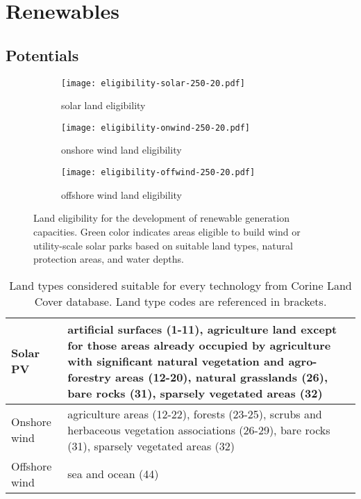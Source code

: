 
\section{Renewables}
\label{sec:si:renewables}

\subsection{Potentials}
\label{sec:si:renewable-potentials}


\begin{figure}
    \centering
    \begin{subfigure}[t]{0.48\textwidth}
            \centering
        \caption{solar land eligibility}
        \texttt{[image: eligibility-solar-250-20.pdf]}
    \end{subfigure}
    \begin{subfigure}[t]{0.48\textwidth}
        \centering
        \caption{onshore wind land eligibility}
        \texttt{[image: eligibility-onwind-250-20.pdf]}
    \end{subfigure}
    \begin{subfigure}[t]{0.48\textwidth}
        \centering
        \vspace{.5cm}
        \caption{offshore wind land eligibility}
        \texttt{[image: eligibility-offwind-250-20.pdf]}
    \end{subfigure}
    \caption{Land eligibility for the development of renewable generation capacities. Green color indicates
    areas eligible to build wind or utility-scale solar parks based on suitable land types, natural protection areas, and water depths.}
    \label{fig:eligibility}
\end{figure}

\begin{table}
    \caption{Land types considered suitable for every technology from Corine Land Cover database. Land type codes are referenced in brackets.}
    \small
    \begin{tabularx}{\textwidth}{lX}
        \toprule
        Solar PV & artificial surfaces (1-11), agriculture land except for those
        areas already occupied by agriculture with significant natural
        vegetation and agro-forestry areas (12-20), natural grasslands (26), bare rocks (31),
        sparsely vegetated areas (32) \\ \midrule
        Onshore wind & agriculture areas (12-22), forests (23-25), scrubs and herbaceous vegetation associations (26-29), bare rocks (31), sparsely vegetated areas (32) \\ \midrule
        Offshore wind & sea and ocean (44) \\ \bottomrule
    \end{tabularx}
    \label{tab:eligibility}
\end{table}

